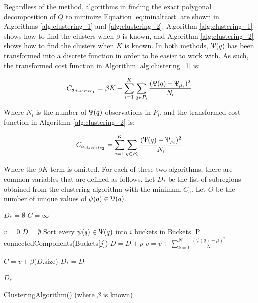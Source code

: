 \documentclass[conference]{IEEEtran}
\theoremstyle{plain}%
\begin{document}
Regardless of the method, algorithms in finding the exact polygonal decomposition of $Q$ to minimize Equation \ref{eq:minaltcost} are shown in Algorithms \ref{alg:clustering_1} and \ref{alg:clustering_2}. Algorithm \ref{alg:clustering_1} shows how to find the clusters when $\beta$ is known, and Algorithm \ref{alg:clustering_2} shows how to find the clusters when $K$ is known. In both methods, $\Uppsi(q)$ has been transformed into a discrete function in order to be easier to work with. As such, the transformed cost function in Algorithm \ref{alg:clustering_1} is:

\begin{equation} \label{eq:minaltcostdisc1}
C_{a_{discrete_{1}}} =  \beta K + \sum_{i=1}^{K} \sum_{q \in P_i} \frac{(\Uppsi(q)-\Uppsi_{\mu_i})^2}{N_i}
\end{equation}

Where $N_i$ is the number of $\Uppsi(q)$ observations in $P_i$, and the transformed cost function in Algorithm \ref{alg:clustering_2} is:

\begin{equation} \label{eq:minaltcostdisc2}
C_{a_{discrete_{2}}} = \sum_{i=1}^{K} \sum_{q \in P_i} \frac{(\Uppsi(q)-\Uppsi_{\mu_i})^2}{N_i}
\end{equation}

Where the $\beta K$ term is omitted. For each of these two algorithms, there are common variables that are defined as follows. Let $D_*$ be the list of subregions obtained from the clustering algorithm with the minimum $C_a$. Let $O$ be the number of unique values of $\psi(q) \in \Uppsi(q)$.

\begin{algorithm}
\begin{algorithmic}[1]
\STATE $D_* = \emptyset$
\STATE $C = \infty$ 

\STATE $v = 0$ 
\STATE $D = \emptyset$ 
\STATE Sort every $\psi(q) \in \Uppsi(q)$ into $i$ buckets in Buckets. \label{alg:clustering_1:sortIntoBuckets} %
\STATE P = connectedComponents(Buckets[$j$]) %
\STATE $D = D + p$
\STATE $v = v + \sum_{k=1}^{N} \frac{(\psi(q)-\mu)^2}{N}$  \label{alg:clustering_1:varianceSum}
\ENDFOR
\ENDFOR

\STATE $C = v + \beta (D$.size)
\STATE $D_* = D$
\ENDIF

\ENDFOR

\RETURN $D_*$
\end{algorithmic}
\caption{ClusteringAlgorithm() (where $\beta$ is known)} 
\label{alg:clustering_1}
\end{algorithm}
\end{document}
